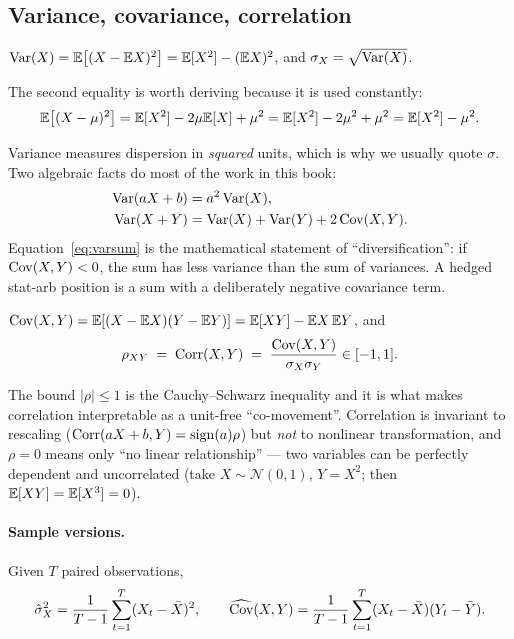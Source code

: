\subsection{Variance, covariance, correlation}
\label{sec:prob:variance}

\begin{definition}
\label{def:variance}
$\operatorname{Var}(X) = \mathbb{E}\bigl[(X-\mathbb{E} X)^2\bigr] = \mathbb{E}[X^2]-(\mathbb{E} X)^2$, and
$\sigma_X=\sqrt{\operatorname{Var}(X)}$.
\end{definition}

The second equality is worth deriving because it is used constantly:
\[
  \mathbb{E}\bigl[(X-\mu)^2\bigr] = \mathbb{E}[X^2] - 2\mu\mathbb{E}[X] + \mu^2
  = \mathbb{E}[X^2] - 2\mu^2 + \mu^2 = \mathbb{E}[X^2]-\mu^2 .
\]

Variance measures dispersion in \emph{squared} units, which is why we usually quote
$\sigma$. Two algebraic facts do most of the work in this book:
\begin{align}
  \operatorname{Var}(aX+b) &= a^2\operatorname{Var}(X) , \label{eq:varaffine}\\
  \operatorname{Var}(X+Y) &= \operatorname{Var}(X)+\operatorname{Var}(Y)+2\operatorname{Cov}(X,Y) . \label{eq:varsum}
\end{align}
Equation~\eqref{eq:varsum} is the mathematical statement of ``diversification'': if
$\operatorname{Cov}(X,Y)<0$, the sum has less variance than the sum of variances. A hedged
stat-arb position is a sum with a deliberately negative covariance term.

\begin{definition}
$\operatorname{Cov}(X,Y)=\mathbb{E}[(X-\mathbb{E} X)(Y-\mathbb{E} Y)]=\mathbb{E}[XY]-\mathbb{E} X\,\mathbb{E} Y$, and
\begin{equation}
  \rho_{XY} \;=\; \operatorname{Corr}(X,Y) \;=\; \frac{\operatorname{Cov}(X,Y)}{\sigma_X\sigma_Y}\in[-1,1].
  \label{eq:correlation}
\end{equation}
\end{definition}

The bound $|\rho|\le1$ is the Cauchy--Schwarz inequality and it is what makes
correlation interpretable as a unit-free ``co-movement''. Correlation is invariant to
rescaling ($\operatorname{Corr}(aX+b,Y)=\operatorname{sign}(a)\rho$) but \emph{not} to nonlinear transformation, and
$\rho=0$ means only ``no linear relationship'' --- two variables can be perfectly
dependent and uncorrelated (take $X\sim\mathcal N(0,1)$, $Y=X^2$; then $\mathbb{E}[XY]=\mathbb{E}[X^3]=0$).

\paragraph{Sample versions.} Given $T$ paired observations,
\begin{equation}
  \hat\sigma_X^2 = \frac{1}{T-1}\sum_{t=1}^{T}(X_t-\bar X)^2,
  \qquad
  \widehat{\operatorname{Cov}}(X,Y) = \frac{1}{T-1}\sum_{t=1}^{T}(X_t-\bar X)(Y_t-\bar Y).
  \label{eq:samplevar}
\end{equation}

